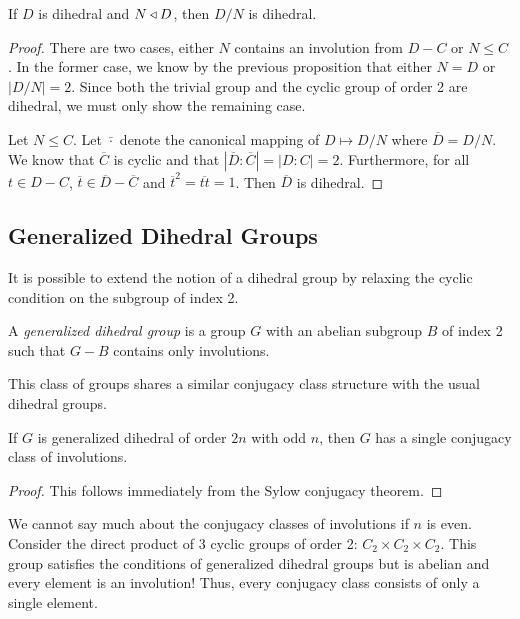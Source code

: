 \documentclass[main.tex]{subfiles}
\begin{document}
\begin{proposition}
If $D$ is dihedral and $N \triangleleft D$, then $D/N$ is dihedral.
\end{proposition}

\begin{proof}
There are two cases, either $N$ contains an involution from $D - C$  or $N \le C$. In the former case, we know by the previous proposition that either $N = D$ or $|D/N| = 2$. Since both the trivial group and the cyclic group of order 2 are dihedral, we must only show the remaining case.

Let $N \le C$. Let $\bar{ \cdot }$ denote the canonical mapping of $D \mapsto D/N$ where $\overline{D} = D/N$. We know that $\overline{C}$ is cyclic and that $|\overline{D} : \overline{C}| = |D : C| = 2$. Furthermore, for all $t \in D - C$, $\overline{t} \in \overline{D} - \overline{C}$ and $\overline{t}^2 = \overline{tt} = 1$. Then $\overline{D}$ is dihedral.

\end{proof}

\subsection{Generalized Dihedral Groups}

It is possible to extend the notion of a dihedral group by relaxing the cyclic condition on the subgroup of index 2.

\begin{definition}
A \emph{generalized dihedral group} is a group $G$ with an abelian subgroup $B$ of index 2 such that $G - B$ contains only involutions.
\end{definition}

This class of groups shares a similar conjugacy class structure with the usual dihedral groups.

\begin{proposition}
If $G$ is generalized dihedral of order $2n$ with odd $n$, then $G$ has a single conjugacy class of involutions.
\end{proposition}

\begin{proof}
This follows immediately from the Sylow conjugacy theorem.
\end{proof}

We cannot say much about the conjugacy classes of involutions if $n$ is even. Consider the direct product of 3 cyclic groups of order 2: $C_2 \times C_2 \times C_2$. This group satisfies the conditions of generalized dihedral groups but is abelian and every element is an involution! Thus, every conjugacy class consists of only a single element.
\end{document}
